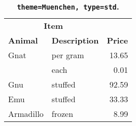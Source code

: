 \begin{table}[!htb]
\large
\sffamily
\centering
\setlength{\extrarowheight}{1pt}
\begin{tabular}{llr}
\multicolumn{2}{c}{\textbf{Item}} &                      \\
\textbf{Animal}                   & \textbf{Description} & \textbf{Price} \\
Gnat                      & per gram & 13.65 \\
\rowcolor{latextbl!20}    & each     & 0.01  \\
Gnu                       & stuffed  & 92.59 \\
\rowcolor{latextbl!20}Emu & stuffed  & 33.33 \\
Armadillo                 & frozen   & 8.99  \\
\end{tabular}
\caption[\texttt{theme=Muenchen, type=std}]{\textbf{\texttt{theme=Muenchen, type=std}. }}
\end{table}
